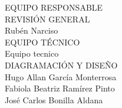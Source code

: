 \clearpage

$\ $
\vspace{1cm}

\begin{center}
	{\Bold \LARGE EQUIPO RESPONSABLE}\\[2cm]
	
	{\Bold \large \color{color1!89!black} REVISIÓN GENERAL}\\[0.2cm]
	Rubén Narciso\\[0.8cm]
	
	
	{\Bold \large \color{color1!89!black} EQUIPO TÉCNICO}\\[0.2cm]
	Equipo tecnico \\[0.8cm] 
	
	{\Bold \large \color{color1!89!black} DIAGRAMACIÓN Y DISEÑO}\\[0.2cm]
	Hugo Allan García Monterrosa\\
	Fabiola Beatriz Ramírez Pinto\\
	José Carlos Bonilla Aldana\\[0.8cm]
	
	
	
\end{center}\setcounter{page}{0}\cleardoublepage



$\ $\\[1cm]

\tableofcontents

\cleardoublepage
\pagestyle{estandar}
\setcounter{page}{1}
\setlength{\arrayrulewidth}{1.0pt}


\cleardoublepage





$\ $\\[0.5cm]
\thispagestyle{empty}




